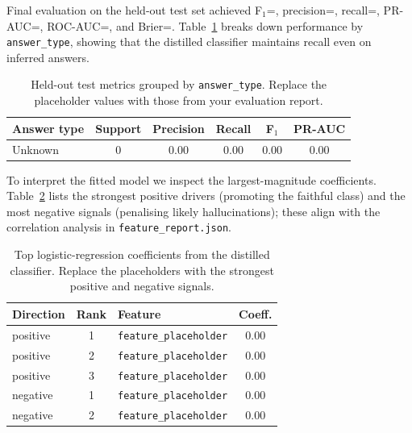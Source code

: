 \documentclass[11pt]{article}
\begin{document}
Final evaluation on the held-out test set achieved F$_1$=\EstTestFOne{}, precision=\EstTestPrecision{}, recall=\EstTestRecall{}, PR-AUC=\EstTestPrauc{}, ROC-AUC=\EstTestRocauc{}, and Brier=\EstTestBrier{}. Table~\ref{tab:test-answer-type} breaks down performance by \texttt{answer\_type}, showing that the distilled classifier maintains recall even on inferred answers.

\begin{table}[ht]
  \centering
  \renewcommand{\arraystretch}{1.15}
  \begin{tabular}{@{}lccccc@{}}
    \toprule
    \textbf{Answer type} & \textbf{Support} & \textbf{Precision} & \textbf{Recall} & \textbf{F$_1$} & \textbf{PR-AUC} \\
    \midrule
    Unknown & 0 & 0.00 & 0.00 & 0.00 & 0.00 \\
    \bottomrule
  \end{tabular}
  \caption{Held-out test metrics grouped by \texttt{answer\_type}. Replace the placeholder values with those from your evaluation report.}
  \label{tab:test-answer-type}
\end{table}

To interpret the fitted model we inspect the largest-magnitude coefficients. Table~\ref{tab:top-features} lists the strongest positive drivers (promoting the faithful class) and the most negative signals (penalising likely hallucinations); these align with the correlation analysis in \texttt{feature\_report.json}.

\begin{table}[ht]
  \centering
  \renewcommand{\arraystretch}{1.1}
  \begin{tabular}{@{}lclc@{}}
    \toprule
    \textbf{Direction} & \textbf{Rank} & \textbf{Feature} & \textbf{Coeff.} \\
    \midrule
    positive & 1 & \texttt{feature\_placeholder} & 0.00 \\
    positive & 2 & \texttt{feature\_placeholder} & 0.00 \\
    positive & 3 & \texttt{feature\_placeholder} & 0.00 \\
    negative & 1 & \texttt{feature\_placeholder} & 0.00 \\
    negative & 2 & \texttt{feature\_placeholder} & 0.00 \\
    \bottomrule
  \end{tabular}
  \caption{Top logistic-regression coefficients from the distilled classifier. Replace the placeholders with the strongest positive and negative signals.}
  \label{tab:top-features}
\end{table}
\end{document}
